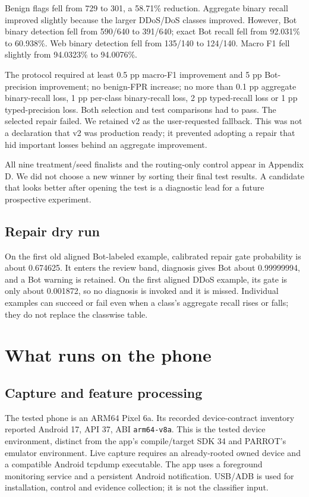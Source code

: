 \documentclass[11pt,a4paper,oneside]{report}
\newcommand{\code}[1]{\nolinkurl{#1}}
\begin{document}
Benign flags fell from 729 to 301, a 58.71\% reduction. Aggregate binary recall improved slightly because the larger DDoS/DoS classes improved. However, Bot binary detection fell from 590/640 to 391/640; exact Bot recall fell from 92.031\% to 60.938\%. Web binary detection fell from 135/140 to 124/140. Macro F1 fell slightly from 94.0323\% to 94.0076\%.

The protocol required at least 0.5 pp macro-F1 improvement and 5 pp Bot-precision improvement; no benign-FPR increase; no more than 0.1 pp aggregate binary-recall loss, 1 pp per-class binary-recall loss, 2 pp typed-recall loss or 1 pp typed-precision loss. Both selection and test comparisons had to pass. The selected repair failed. We retained v2 as the user-requested fallback. This was not a declaration that v2 was production ready; it prevented adopting a repair that hid important losses behind an aggregate improvement.

All nine treatment/seed finalists and the routing-only control appear in Appendix D. We did not choose a new winner by sorting their final test results. A candidate that looks better after opening the test is a diagnostic lead for a future prospective experiment.

\section{Repair dry run}
On the first old aligned Bot-labeled example, calibrated repair gate probability is about 0.674625. It enters the review band, diagnosis gives Bot about 0.99999994, and a Bot warning is retained. On the first aligned DDoS example, its gate is only about 0.001872, so no diagnosis is invoked and it is missed. Individual examples can succeed or fail even when a class's aggregate recall rises or falls; they do not replace the classwise table.

\chapter{What runs on the phone}
\section{Capture and feature processing}
The tested phone is an ARM64 Pixel 6a. Its recorded device-contract inventory reported Android 17, API 37, ABI \code{arm64-v8a}. This is the tested device environment, distinct from the app's compile/target SDK 34 and PARROT's emulator environment. Live capture requires an already-rooted owned device and a compatible Android tcpdump executable. The app uses a foreground monitoring service and a persistent Android notification. USB/ADB is used for installation, control and evidence collection; it is not the classifier input.
\end{document}
